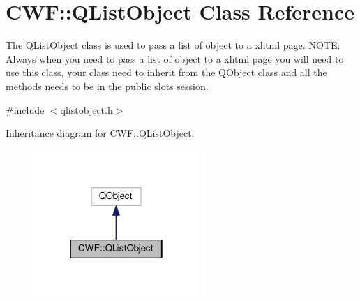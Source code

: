 \hypertarget{class_c_w_f_1_1_q_list_object}{\section{C\+W\+F\+:\+:Q\+List\+Object Class Reference}
\label{class_c_w_f_1_1_q_list_object}
}


The \hyperlink{class_c_w_f_1_1_q_list_object}{Q\+List\+Object} class is used to pass a list of object to a xhtml page. N\+O\+T\+E\+: Always when you need to pass a list of object to a xhtml page you will need to use this class, your class need to inherit from the Q\+Object class and all the methods needs to be in the public slots session.  




{\ttfamily \#include $<$qlistobject.\+h$>$}



Inheritance diagram for C\+W\+F\+:\+:Q\+List\+Object\+:
\nopagebreak
\begin{figure}[H]
\begin{center}
\leavevmode
\includegraphics[width=178pt]{class_c_w_f_1_1_q_list_object__inherit__graph}
\end{center}
\end{figure}
